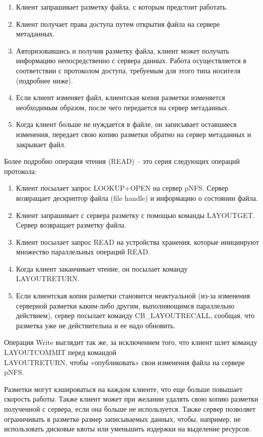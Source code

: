 \documentclass[10pt, a5paper]{article}
\begin{document}
\begin{enumerate}
  \item Клиент запрашивает разметку файла, с которым предстоит работать.
  \item Клиент получает права доступа путем открытия файла на сервере метаданных.
  \item Авторизовавшись и получив разметку файла, клиент может получать информацию непосредственно с сервера данных. Работа осуществляется в соответствии с протоколом доступа, требуемым для этого типа носителя (подробнее ниже).
  \item Если клиент изменяет файл, клиентская копия разметки изменяется необходимым образом, после чего передается на сервер метаданных.
  \item Когда клиент больше не нуждается в файле, он записывает оставшиеся изменения, передает свою копию разметки обратно на сервер метаданных и закрывает файл.
\end{enumerate}

Более подробно операция чтения (READ) – это серия следующих операций протокола:

\begin{enumerate}
  \item Клиент посылает запрос LOOKUP+OPEN на сервер pNFS. Сервер возвращает дескриптор файла (file handle) и информацию о состоянии файла.
  \item Клиент запрашивает с сервера разметку с помощью команды LAYOUTGET. Сервер возвращает разметку файла.
  \item Клиент посылает запрос READ на устройства хранения, которые инициируют множество параллельных операций READ.
  \item Когда клиент заканчивает чтение, он посылает команду\\ LAYOUTRETURN.
  \item Если клиентская копия разметки становится неактуальной (из-за изменения серверной разметки каким-либо другим, выполняющимся параллельно действием), сервер посылает команду CB\_LAYOUTRECALL, сообщая, что разметка уже не действительна и ее надо обновить.
\end{enumerate}

Операция Write выглядит так же, за исключением того, что клиент шлет команду LAYOUTCOMMIT перед командой\\ LAYOUTRETURN, чтобы «опубликовать» свои изменения файла на сервере pNFS.

Разметки могут кэшироваться на каждом клиенте, что еще больше повышает скорость работы. Также клиент может при желании удалять свою копию разметки полученной с сервера, если она больше не используется. Также сервер позволяет ограничивать в разметке размер записываемых данных, чтобы, например, не использовать дисковые квоты или уменьшить издержки на выделение ресурсов.
\end{document}

